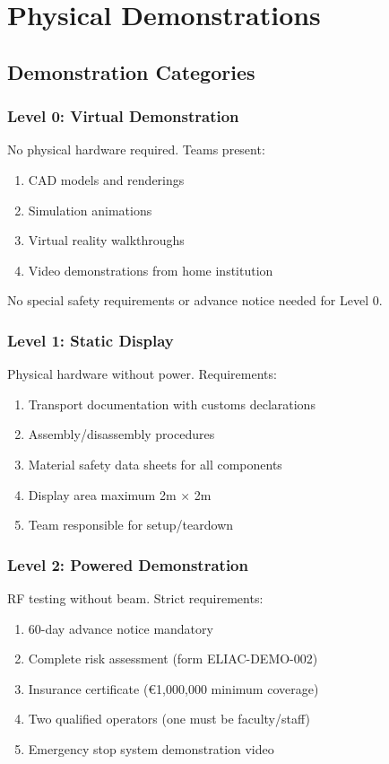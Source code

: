 
\renewcommand{\thesection}{PD}
\section{Physical Demonstrations}

\subsection{Demonstration Categories}

\subsubsection{Level 0: Virtual Demonstration}
No physical hardware required. Teams present:
\begin{enumerate}[noitemsep]
    \item CAD models and renderings
    \item Simulation animations
    \item Virtual reality walkthroughs
    \item Video demonstrations from home institution
\end{enumerate}

No special safety requirements or advance notice needed for Level 0.

\subsubsection{Level 1: Static Display}
Physical hardware without power. Requirements:
\begin{enumerate}[noitemsep]
    \item Transport documentation with customs declarations
    \item Assembly/disassembly procedures
    \item Material safety data sheets for all components
    \item Display area maximum 2m × 2m
    \item Team responsible for setup/teardown
\end{enumerate}

\subsubsection{Level 2: Powered Demonstration}
RF testing without beam. Strict requirements:
\begin{enumerate}[noitemsep]
    \item 60-day advance notice mandatory
    \item Complete risk assessment (form ELIAC-DEMO-002)
    \item Insurance certificate (€1,000,000 minimum coverage)
    \item Two qualified operators (one must be faculty/staff)
    \item Emergency stop system demonstration video
\end{enumerate}

